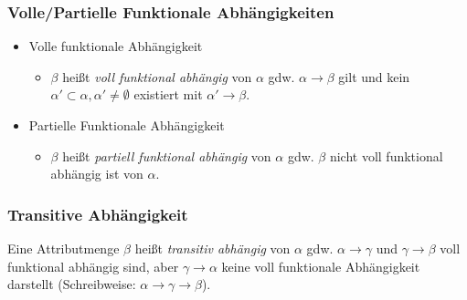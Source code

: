 \documentclass[a4paper, 11pt, accentcolor = tud3b]{tudreport}
\begin{document}
                \subsubsection{Volle/Partielle Funktionale Abhängigkeiten} %
                    \begin{itemize}
                    	\item Volle funktionale Abhängigkeit
                    		\begin{itemize}
                    			\item \(\beta\) heißt \textit{voll funktional abhängig} von \(\alpha\) gdw. \(\alpha \rightarrow \beta\) gilt und kein \( \alpha' \subset \alpha, \alpha' \neq \emptyset \) existiert mit \( \alpha' \rightarrow \beta \).
                    		\end{itemize}
                    	\item Partielle Funktionale Abhängigkeit
                    		\begin{itemize}
                    			\item \( \beta \) heißt \textit{partiell funktional abhängig} von \(\alpha\) gdw. \(\beta\) nicht voll funktional abhängig ist von \(\alpha\).
                    		\end{itemize}
                    \end{itemize}
                
                \subsubsection{Transitive Abhängigkeit} %
	                Eine Attributmenge \(\beta\) heißt \textit{transitiv abhängig} von \(\alpha\) gdw. \(\alpha \rightarrow \gamma\) und \(\gamma \rightarrow \beta\) voll funktional abhängig sind, aber \(\gamma \rightarrow \alpha\) keine voll funktionale Abhängigkeit darstellt (Schreibweise: \( \alpha \rightarrow \gamma \rightarrow \beta \)).
\end{document}
